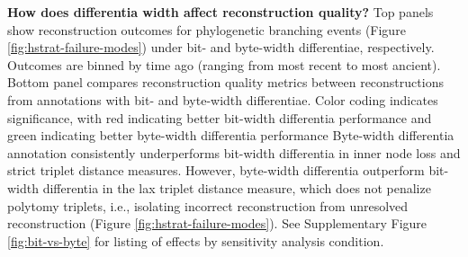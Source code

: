 \begin{figure*}
{  \textbf{How does differentia width affect reconstruction quality?}
   Top panels show reconstruction outcomes for phylogenetic branching events (Figure \ref{fig:hstrat-failure-modes}) under bit- and byte-width differentiae, respectively.
   Outcomes are binned by time ago (ranging from most recent to most ancient).
   Bottom panel compares reconstruction quality metrics between reconstructions from annotations with bit- and byte-width differentiae.
   Color coding indicates significance, with red indicating better bit-width differentia performance and green indicating better byte-width differentia performance
   Byte-width differentia annotation consistently underperforms bit-width differentia in inner node loss and strict triplet distance measures.
   However, byte-width differentia outperform bit-width differentia in the lax triplet distance measure, which does not penalize polytomy triplets, i.e., isolating incorrect reconstruction from unresolved reconstruction (Figure \ref{fig:hstrat-failure-modes}).
  See Supplementary Figure \ref{fig:bit-vs-byte} for listing of effects by sensitivity analysis condition.
}
  \label{fig:bit-vs-byte-summary}

\end{figure*}
